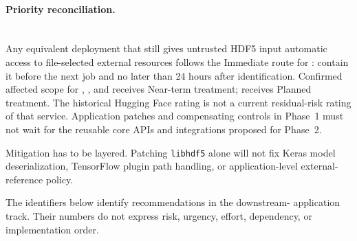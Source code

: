 \documentclass[../main.tex]{subfiles}
\begin{document}
\paragraph{Priority reconciliation.}\mbox{}\\
Any equivalent deployment that still gives untrusted HDF5 input automatic
access to file-selected external resources follows the Immediate route for
: contain it before the next job and no later than 24 hours
after identification. Confirmed affected scope for ,
, and  receives Near-term treatment;
 receives Planned treatment. The historical Hugging Face
rating is not a current residual-risk rating of that service. Application
patches and compensating controls in Phase~1 must not wait for the reusable
core APIs and integrations proposed for Phase~2.

Mitigation has to be layered. Patching \texttt{libhdf5}
alone will not fix Keras model deserialization, TensorFlow plugin
path handling, or application-level external-reference policy.

The  identifiers below identify recommendations in the downstream-
application track. Their numbers do not express risk, urgency, effort,
dependency, or implementation order.
\end{document}
